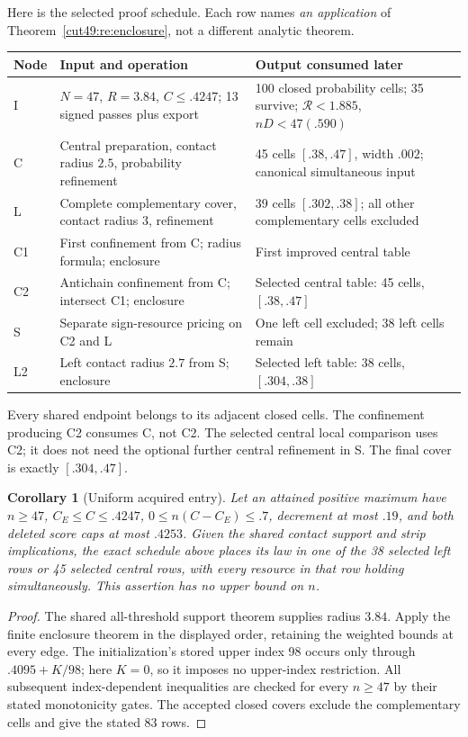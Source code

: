 \documentclass[11pt,a4paper]{article}
\numberwithin{equation}{section}
\newtheorem{corollary}[theorem]{Corollary}
\theoremstyle{definition}
\theoremstyle{remark}
\begin{document}
Here is the selected proof schedule. Each row names \emph{an application}
of Theorem~\ref{cut49:re:enclosure}, not a different analytic theorem.
\begin{center}\small
\begin{tabular}{p{.13\linewidth}p{.32\linewidth}p{.45\linewidth}}
\toprule
Node&Input and operation&Output consumed later\\\midrule
I&$N=47$, $R=3.84$, $C\le.4247$; 13 signed passes plus export&
100 closed probability cells; 35 survive; $\mathcal R<1.885$, $nD<47(.590)$\\
C&Central preparation, contact radius $2.5$, probability refinement&
45 cells $[.38,.47]$, width $.002$; canonical simultaneous input\\
L&Complete complementary cover, contact radius $3$, refinement&
39 cells $[.302,.38]$; all other complementary cells excluded\\
C1&First confinement from C; radius formula; enclosure&
First improved central table\\
C2&Antichain confinement from C; intersect C1; enclosure&
Selected central table: 45 cells, $[.38,.47]$\\
S&Separate sign-resource pricing on C2 and L&
One left cell excluded; 38 left cells remain\\
L2&Left contact radius $2.7$ from S; enclosure&
Selected left table: 38 cells, $[.304,.38]$\\\bottomrule
\end{tabular}
\end{center}
Every shared endpoint belongs to its adjacent closed cells. The
confinement producing C2 consumes C, not C2. The selected central local
comparison uses C2; it does not need the optional further central
refinement in S. The final cover is exactly $[.304,.47]$.

\begin{corollary}[Uniform acquired entry]\label{cut49:re:acquired}
Let an attained positive maximum have $n\ge47$, $C_E\le C\le.4247$,
$0\le n(C-C_E)\le.7$, decrement at most $.19$, and both deleted
score caps at most $.4253$.
Given the shared contact support and strip implications, the exact
schedule above places its law in one of the 38 selected left rows or
45 selected central rows, with every resource in that row holding
simultaneously. This assertion has no upper bound on $n$.
\end{corollary}
\begin{proof}
The shared all-threshold support theorem supplies radius $3.84$.
Apply the finite enclosure theorem in the displayed order, retaining
the weighted bounds at every edge. The initialization's stored upper
index 98 occurs only through $.4095+K/98$; here $K=0$, so it imposes
no upper-index restriction. All subsequent index-dependent inequalities
are checked for every $n\ge47$ by their stated monotonicity gates.
The accepted closed covers exclude the complementary cells and give
the stated 83 rows.
\end{proof}
\end{document}
